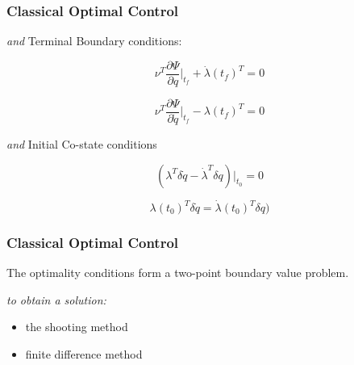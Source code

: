 \documentclass{beamer}
\begin{document}

\begin{frame}
\frametitle{Classical Optimal Control}


\textit{and} Terminal Boundary conditions:

\begin{equation}
    \nu^T \frac{\partial \Psi}{\partial q}|_{t_f} + \dot \lambda(t_f)^T = 0
\end{equation}

\begin{equation}
    \nu^T \frac{\partial \Psi}{\partial \dot q}|_{t_f} - \lambda(t_f)^T = 0
\end{equation}


\textit{and} Initial Co-state conditions

\begin{equation}
    ( \lambda^T \delta \dot q - \dot \lambda^T \delta q )|_{t_0} = 0
\end{equation}

\begin{equation}
    \lambda(t_0)^T \delta \dot q = \dot \lambda(t_0)^T \delta q )
\end{equation}





\end{frame}




\begin{frame}
\frametitle{Classical Optimal Control}

The optimality conditions form a two-point boundary value problem. 

\textit{to obtain a solution:}

\begin{itemize}
	\item the shooting method	 	
	\item finite difference method
\end{itemize}


\end{frame}



\end{document}
